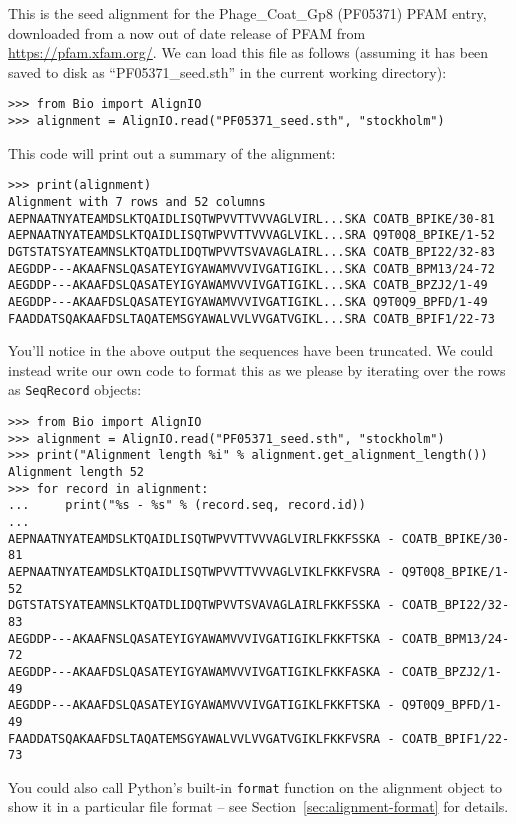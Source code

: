 This is the seed alignment for the Phage\_Coat\_Gp8 (PF05371) PFAM entry, downloaded from a now out of date release of PFAM from \url{https://pfam.xfam.org/}.  We can load this file as follows (assuming it has been saved to disk as ``PF05371\_seed.sth'' in the current working directory):

\begin{verbatim}
>>> from Bio import AlignIO
>>> alignment = AlignIO.read("PF05371_seed.sth", "stockholm")
\end{verbatim}

\noindent This code will print out a summary of the alignment:

\begin{verbatim}
>>> print(alignment)
Alignment with 7 rows and 52 columns
AEPNAATNYATEAMDSLKTQAIDLISQTWPVVTTVVVAGLVIRL...SKA COATB_BPIKE/30-81
AEPNAATNYATEAMDSLKTQAIDLISQTWPVVTTVVVAGLVIKL...SRA Q9T0Q8_BPIKE/1-52
DGTSTATSYATEAMNSLKTQATDLIDQTWPVVTSVAVAGLAIRL...SKA COATB_BPI22/32-83
AEGDDP---AKAAFNSLQASATEYIGYAWAMVVVIVGATIGIKL...SKA COATB_BPM13/24-72
AEGDDP---AKAAFDSLQASATEYIGYAWAMVVVIVGATIGIKL...SKA COATB_BPZJ2/1-49
AEGDDP---AKAAFDSLQASATEYIGYAWAMVVVIVGATIGIKL...SKA Q9T0Q9_BPFD/1-49
FAADDATSQAKAAFDSLTAQATEMSGYAWALVVLVVGATVGIKL...SRA COATB_BPIF1/22-73
\end{verbatim}

You'll notice in the above output the sequences have been truncated.  We could instead write our own code to format this as we please by iterating over the rows as \verb|SeqRecord| objects:

\begin{verbatim}
>>> from Bio import AlignIO
>>> alignment = AlignIO.read("PF05371_seed.sth", "stockholm")
>>> print("Alignment length %i" % alignment.get_alignment_length())
Alignment length 52
>>> for record in alignment:
...     print("%s - %s" % (record.seq, record.id))
...
AEPNAATNYATEAMDSLKTQAIDLISQTWPVVTTVVVAGLVIRLFKKFSSKA - COATB_BPIKE/30-81
AEPNAATNYATEAMDSLKTQAIDLISQTWPVVTTVVVAGLVIKLFKKFVSRA - Q9T0Q8_BPIKE/1-52
DGTSTATSYATEAMNSLKTQATDLIDQTWPVVTSVAVAGLAIRLFKKFSSKA - COATB_BPI22/32-83
AEGDDP---AKAAFNSLQASATEYIGYAWAMVVVIVGATIGIKLFKKFTSKA - COATB_BPM13/24-72
AEGDDP---AKAAFDSLQASATEYIGYAWAMVVVIVGATIGIKLFKKFASKA - COATB_BPZJ2/1-49
AEGDDP---AKAAFDSLQASATEYIGYAWAMVVVIVGATIGIKLFKKFTSKA - Q9T0Q9_BPFD/1-49
FAADDATSQAKAAFDSLTAQATEMSGYAWALVVLVVGATVGIKLFKKFVSRA - COATB_BPIF1/22-73
\end{verbatim}

You could also call Python's built-in \verb|format| function on the alignment object to show it in a particular file format  -- see Section~\ref{sec:alignment-format} for details.

